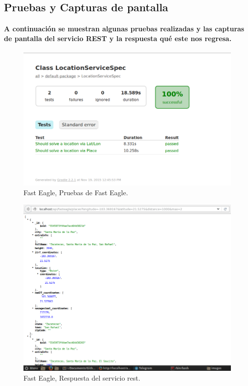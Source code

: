   \subsection{Pruebas y Capturas de pantalla}
    \paragraph{A continuación se muestran algunas pruebas realizadas y las capturas de pantalla del servicio REST y la respuesta qué este nos regresa.}
    \begin{figure}[h!]
      \centering
        \includegraphics[width=\textwidth]{./images/PruebasFastEagle}
        \caption{Fast Eagle, Pruebas de Fast Eagle.}
    \end{figure}
    \begin{figure}[h!]
      \centering
        \includegraphics[width=\textwidth]{./images/CapturaFastEagle}
        \caption{Fast Eagle, Respuesta del servicio rest.}
    \end{figure}